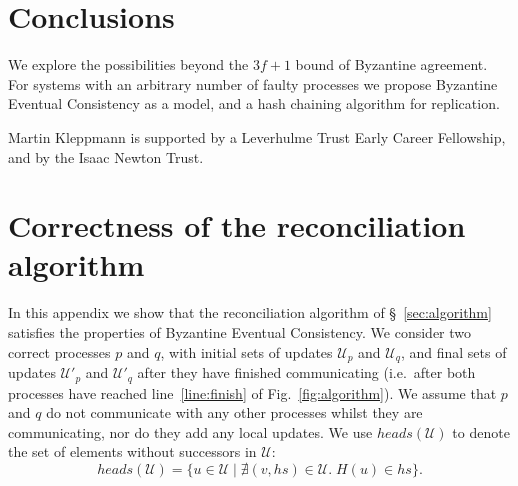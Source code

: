 \documentclass[manuscript,anonymous]{acmart}
\begin{document}






\section{Conclusions}

We explore the possibilities beyond the $3f+1$ bound of Byzantine agreement.
For systems with an arbitrary number of faulty processes we propose Byzantine Eventual Consistency as a model, and a hash chaining algorithm for replication.

\begin{acks}
Martin Kleppmann is supported by a Leverhulme Trust Early Career Fellowship, and by the Isaac Newton Trust.
\end{acks}




\appendix
\section{Correctness of the reconciliation algorithm}

In this appendix we show that the reconciliation algorithm of \S~\ref{sec:algorithm} satisfies the properties of Byzantine Eventual Consistency.
We consider two correct processes $p$ and $q$, with initial sets of updates $\mathcal{U}_p$ and $\mathcal{U}_q$, and final sets of updates $\mathcal{U}'_p$ and $\mathcal{U}'_q$ after they have finished communicating (i.e.\ after both processes have reached line~\ref{line:finish} of Fig.~\ref{fig:algorithm}).
We assume that $p$ and $q$ do not communicate with any other processes whilst they are communicating, nor do they add any local updates.
We use $\mathit{heads}(\mathcal{U})$ to denote the set of elements without successors in $\mathcal{U}$:
\[ \mathit{heads}(\mathcal{U}) = \{u \in \mathcal{U} \mid \nexists (v, \mathit{hs}) \in \mathcal{U}.\; H(u) \in \mathit{hs}\}. \]
\end{document}
